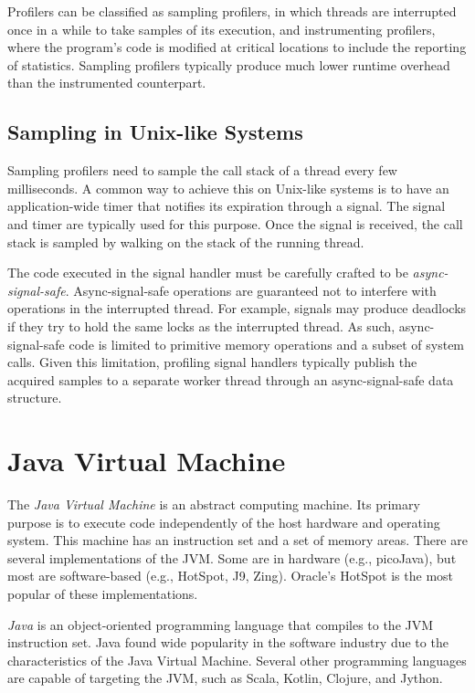 Profilers can be classified as sampling profilers, in which threads are interrupted once in a while to take samples of its execution, and instrumenting profilers, where the program's code is modified at critical locations to include the reporting of statistics. Sampling profilers typically produce much lower runtime overhead than the instrumented counterpart.

\subsection{Sampling in Unix-like Systems}

Sampling profilers need to sample the call stack of a thread every few milliseconds. A common way to achieve this on Unix-like systems is to have an application-wide timer that notifies its expiration through a signal. The  signal and  timer are typically used for this purpose. Once the signal is received, the call stack is sampled by walking on the stack of the running thread.

The code executed in the signal handler must be carefully crafted to be \emph{async-signal-safe}. Async-signal-safe operations are guaranteed not to interfere with operations in the interrupted thread. For example, signals may produce deadlocks if they try to hold the same locks as the interrupted thread. As such, async-signal-safe code is limited to primitive memory operations and a subset of system calls. Given this limitation, profiling signal handlers typically publish the acquired samples to a separate worker thread through an async-signal-safe data structure.


\section{Java Virtual Machine}

The \emph{Java Virtual Machine} is an abstract computing machine. Its primary purpose is to execute code independently of the host hardware and operating system. This machine has an instruction set and a set of memory areas. There are several implementations of the JVM. Some are in hardware (e.g., picoJava), but most are software-based (e.g., HotSpot, J9, Zing). Oracle's HotSpot is the most popular of these implementations.

\emph{Java} is an object-oriented programming language that compiles to the JVM instruction set. Java found wide popularity in the software industry due to the characteristics of the Java Virtual Machine. Several other programming languages are capable of targeting the JVM, such as Scala, Kotlin, Clojure, and Jython.

